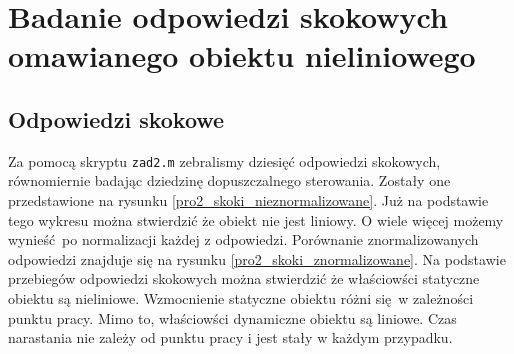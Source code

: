 \chapter{Badanie odpowiedzi skokowych omawianego obiektu nieliniowego}
\label{pro2}


\section{Odpowiedzi skokowe}
Za pomocą skryptu \verb+zad2.m+ zebralismy dziesięć odpowiedzi skokowych, 
równomiernie badając dziedzinę dopuszczalnego sterowania. Zostały one 
przedstawione na rysunku \ref{pro2_skoki_nieznormalizowane}.
Już na podstawie tego wykresu można stwierdzić że obiekt nie jest liniowy. 
O wiele więcej możemy wynieść po normalizacji każdej z odpowiedzi. Porównanie 
znormalizowanych odpowiedzi znajduje się na rysunku \ref{pro2_skoki_znormalizowane}.
Na podstawie przebiegów odpowiedzi skokowych można stwierdzić że właściowści statyczne 
obiektu są nieliniowe. Wzmocnienie statyczne obiektu różni się w zależności punktu pracy.
Mimo to, właściowści dynamiczne obiektu są liniowe. Czas narastania nie zależy od punktu 
pracy i jest stały w każdym przypadku.

